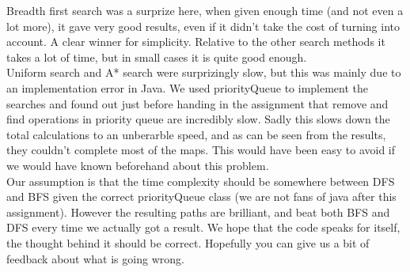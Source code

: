 \documentclass[11pt]{article}
\begin{document}
Breadth first search was a surprize here, when given enough time (and not even a lot more), it gave very good results, even if it didn't take the cost 
of turning into account. A clear winner for simplicity. Relative to the other search methods it takes a lot of time, but in small cases it is quite good enough. \\

Uniform search and A* search were surprizingly slow, but this was mainly due to an implementation error in Java. We used priorityQueue to implement the searches
and found out just before handing in the assignment that remove and find operations in priority queue are incredibly slow. 
Sadly this slows down the total calculations to an unberarble speed, and as can be seen from the results, they couldn't complete most of the maps. 
This would have been easy to avoid if we would have known beforehand about this problem. \\
Our assumption is that the time complexity should be somewhere between DFS and BFS given the correct priorityQueue class
 (we are not fans of java after this assignment). However the resulting paths are brilliant, and beat both BFS and DFS every time we actually got a result.
 We hope that the code speaks for itself, the thought behind it should be correct. Hopefully you can give us a bit of feedback about what is going wrong.
\end{document}
